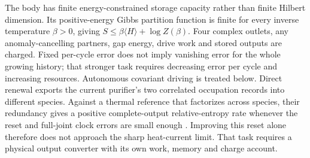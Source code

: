 The body has finite energy-constrained storage capacity rather than
finite Hilbert dimension. Its positive-energy Gibbs partition function
is finite for every inverse temperature $\beta>0$, giving
$S\le\beta\langle H\rangle+\log Z(\beta)$. Four complex outlets,
any anomaly-cancelling partners, gap energy, drive work and stored
outputs are charged. Fixed per-cycle error does not imply vanishing
error for the whole growing history; that stronger task requires
decreasing error per cycle and increasing resources. Autonomous
covariant driving is treated below. Direct renewal exports the
current purifier's two correlated occupation records into different
species. Against a thermal reference that factorizes across species,
their redundancy gives a positive complete-output relative-entropy
rate whenever the reset and full-joint clock errors are small enough
\cite[Proposition ``Output deficit and direct renewal'']{Liu2026HAFFD}.
Improving this reset alone therefore does not approach the sharp
heat-current limit. That task requires a physical output converter
with its own work, memory and charge account.

